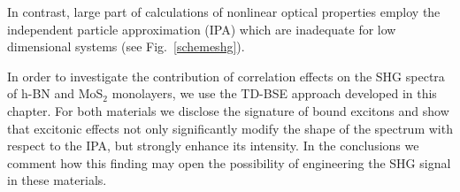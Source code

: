 In contrast, large part of calculations of nonlinear optical properties employ the independent particle approximation\cite{guo2005second,margulis2013optical} (IPA) which are inadequate for low dimensional systems (see Fig.~\ref{schemeshg}).\cite{scholes2006excitons} 


In order to investigate the contribution of correlation effects on the SHG spectra of h-BN and MoS$_2$ monolayers, we use the TD-BSE approach developed in this chapter. For both materials we disclose the signature of bound excitons and show that excitonic effects not only significantly modify the shape of the spectrum with respect to the IPA, but strongly enhance its intensity. In the conclusions we comment how this finding may open the possibility of engineering the SHG signal in these materials. 

